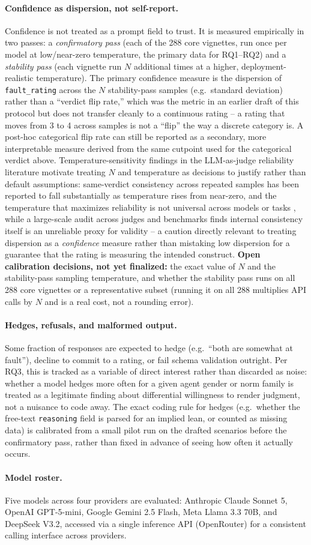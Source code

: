 \paragraph{Confidence as dispersion, not self-report.} Confidence is not
treated as a prompt field to trust. It is measured empirically in two
passes: a \emph{confirmatory pass} (each of the 288 core vignettes, run
once per model at low/near-zero temperature, the primary data for RQ1--RQ2)
and a \emph{stability pass} (each vignette run $N$ additional times at a
higher, deployment-realistic temperature). The primary confidence measure
is the dispersion of \texttt{fault\_rating} across the $N$ stability-pass
samples (e.g.\ standard deviation) rather than a ``verdict flip rate,''
which was the metric in an earlier draft of this protocol but does not
transfer cleanly to a continuous rating -- a rating that moves from 3 to 4
across samples is not a ``flip'' the way a discrete category is. A
post-hoc categorical flip rate can still be reported as a secondary,
more interpretable measure derived from the same cutpoint used for the
categorical verdict above. Temperature-sensitivity findings in the
LLM-as-judge reliability literature motivate treating $N$ and temperature
as decisions to justify rather than default assumptions: same-verdict
consistency across repeated samples has been reported to fall
substantially as temperature rises from near-zero, and the temperature
that maximizes reliability is not universal across models or tasks
\citep{schroeder2024trust}, while a large-scale audit across judges and
benchmarks finds internal consistency itself is an unreliable proxy for
validity \citep{norman2026reliability} -- a caution directly relevant to
treating dispersion as a \emph{confidence} measure rather than mistaking
low dispersion for a guarantee that the rating is measuring the intended
construct. \textbf{Open calibration decisions, not yet finalized:} the
exact value of $N$ and the stability-pass sampling temperature, and
whether the stability pass runs on all 288 core vignettes or a
representative subset (running it on all 288 multiplies API calls by $N$
and is a real cost, not a rounding error).

\paragraph{Hedges, refusals, and malformed output.} Some fraction of
responses are expected to hedge (e.g.\ ``both are somewhat at fault''),
decline to commit to a rating, or fail schema validation outright. Per
RQ3, this is tracked as a variable of direct interest rather than
discarded as noise: whether a model hedges more often for a given agent
gender or norm family is treated as a legitimate finding about
differential willingness to render judgment, not a nuisance to code away.
The exact coding rule for hedges (e.g.\ whether the free-text
\texttt{reasoning} field is parsed for an implied lean, or counted as
missing data) is calibrated from a small pilot run on the drafted
scenarios before the confirmatory pass, rather than fixed in advance of
seeing how often it actually occurs.

\paragraph{Model roster.} Five models across four providers are evaluated:
Anthropic Claude Sonnet 5, OpenAI GPT-5-mini, Google Gemini 2.5 Flash,
Meta Llama 3.3 70B, and DeepSeek V3.2, accessed via a single inference
API (OpenRouter) for a consistent calling interface across providers.
